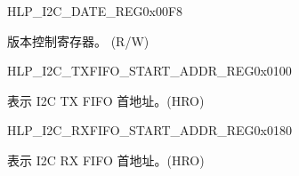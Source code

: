 \begin{register}{H}{LP\_I2C\_DATE\_REG}{0x00F8}\label{regdesc:LPI2CDATEREG}
%
\regnewline%
\begin{regdesc}\begin{reglist}
\label{fielddesc:LPI2CDATE}\item [LP\_I2C\_DATE] 版本控制寄存器。 (R/W)
\end{reglist}\end{regdesc}
\end{register}


\begin{register}{H}{LP\_I2C\_TXFIFO\_START\_ADDR\_REG}{0x0100}\label{regdesc:LPI2CTXFIFOSTARTADDRREG}
%
\regnewline%
\begin{regdesc}\begin{reglist}
\label{fielddesc:LPI2CTXFIFOSTARTADDR}\item [LP\_I2C\_TXFIFO\_START\_ADDR] 表示 I2C TX FIFO 首地址。(HRO)
\end{reglist}\end{regdesc}
\end{register}


\begin{register}{H}{LP\_I2C\_RXFIFO\_START\_ADDR\_REG}{0x0180}\label{regdesc:LPI2CRXFIFOSTARTADDRREG}
%
\regnewline%
\begin{regdesc}\begin{reglist}
\label{fielddesc:LPI2CRXFIFOSTARTADDR}\item [LP\_I2C\_RXFIFO\_START\_ADDR] 表示 I2C RX FIFO 首地址。(HRO)
\end{reglist}\end{regdesc}
\end{register}
